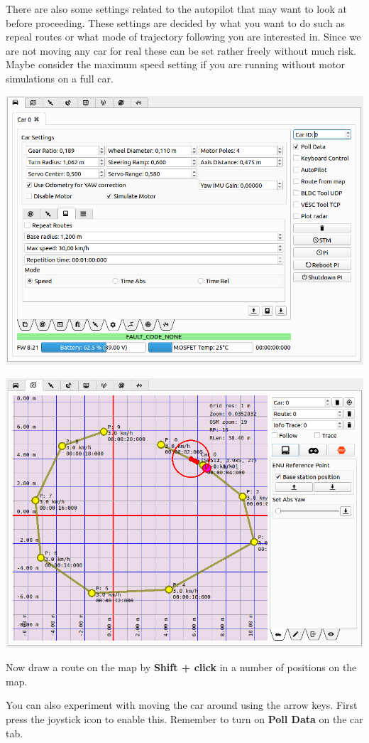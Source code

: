 \documentclass[12pt]{article} %
\begin{document}
\noindent\begin{minipage}{0.5\linewidth} There are also some settings
related to the autopilot that may want to look at before proceeding.
These settings are decided by what you want to do such as repeal
routes or what mode of trajectory following you are interested
in. Since we are not moving any car for real these can be set rather
freely without much risk. Maybe consider the maximum speed setting if
you are running without motor simulations on a full car.
\end{minipage}
\begin{minipage}{0.5\linewidth}
\noindent \includegraphics[width=\textwidth]{./screens/car_tab_autopilot.png}
\end{minipage}



\noindent\begin{minipage}{0.5\linewidth}
\noindent \includegraphics[width=\textwidth]{./screens/autopilotdrive.png}
\end{minipage}
\noindent\begin{minipage}{0.5\linewidth} Now draw a route on the map
by {\bf Shift + click} in a number of positions on the map.

You can also experiment with moving the car around using the arrow keys. First press
the joystick icon to enable this. Remember to turn on {\bf Poll Data} on the car tab.
\end{minipage}
\end{document}
